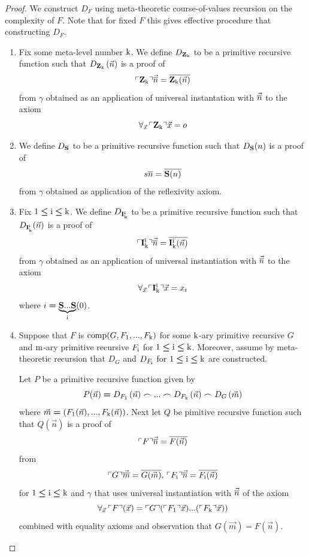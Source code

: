 \documentclass[10pt]{amsart}
\newcommand{\godel}[1]{\ulcorner #1 \urcorner}
\newcommand{\mleq}{\boldsymbol{\leq}}
\newcommand{\meq}{\boldsymbol{=}}
\begin{document}
\begin{proof}
	We construct $D_F$ using meta-theoretic course-of-values recursion on the complexity of $F$. Note that for fixed $F$ this gives effective procedure that constructing $D_F$.
	\begin{enumerate}[label=\textbf{(\arabic*)}, leftmargin=3.0em]
		\item Fix some meta-level number $\rm{k}$. We define $D_{\mathbf{Z}_{\rm{k}}}$ to be a primitive recursive function such that $D_{\mathbf{Z}_{\rm{k}}}\left(\vec{n}\right)$ is a proof of
      $$\godel{\bd{Z}_{\rm{k}}}\vec{\ol{n}} = \ol{\bd{Z}_{\rm{k}}(\vec{n})}$$
		      from $\gamma$ obtained as an application of universal instantation with $\vec{\overline{n}}$ to the axiom
          $$\forall_{\vec{x}}\,\godel{\bd{Z}_{\rm{k}}}\vec{x} = o$$
		\item We define $D_{\mathbf{S}}$ to be a primitive recursive function such that $D_{\mathbf{S}}(n)$ is a proof of
		      $$s\overline{n} = \overline{\mathbf{S}(n)}$$
		      from $\gamma$ obtained as application of the reflexivity axiom.
		\item Fix $\rm{1} \mleq \rm{i} \mleq \rm{k}$. We define $D_{\mathbf{I}^{\rm{i}}_{\rm{k}}}$ to be a primitive recursive function such that $D_{\mathbf{I}^{\rm{i}}_{\rm{k}}}(\vec{n})$ is a proof of
      $$\godel{\bd{I}^{\rm{i}}_{\rm{k}}}\vec{\ol{n}} = \ol{\bd{I}^{\rm{i}}_{\rm{k}}(\vec{n})}$$
		      from $\gamma$ obtained as an application of universal instantiation with $\vec{\overline{n}}$ to the axiom
          $$\forall_{\vec{x}}\,\godel{\bd{I}^{\rm{i}}_{\rm{k}}}\vec{x} = x_i$$
          where $i \meq \underbrace{\bd{S}...\bd{S}}_{\rm{i}}(0)$.
		\item Suppose that $F$ is $\mathrm{comp}(G,F_{\rm{1}},...,F_{\rm{k}})$ for some $\rm{k}$-ary primitive recursive $G$ and $\rm{m}$-ary primitive recursive $F_{\rm{i}}$ for $\rm{1} \mleq \rm{i} \mleq \rm{k}$. Moreover, assume by meta-theoretic recursion that $D_{G}$ and $D_{F_{\rm{i}}}$ for $\rm{1} \mleq \rm{i} \mleq \rm{k}$ are constructed.

		      Let $P$ be a primitive recursive function given by
		      $$P(\vec{n}) \meq D_{F_{\rm{1}}}\left(\vec{n}\right) \frown ... \frown D_{F_{\rm{k}}}\left(\vec{n}\right)\frown D_G\left(\vec{m}\right)$$
		      where $\vec{m} \meq \left(F_{\rm{1}}(\vec{n}),...,F_{\rm{k}}(\vec{n})\right)$. Next let $Q$ be pimitive recursive function such that $Q(\vec{n})$ is a proof of
		      $$\godel{F}\vec{\ol{n}} = \ol{F(\vec{n})}$$
		      from
		      $$\godel{G}\vec{\ol{m}} = \ol{G(\vec{m})},\,\godel{F_{\rm{i}}}\vec{\ol{n}} = \ol{F_{\rm{i}}(\vec{n})}$$
		      for $\rm{1} \mleq \rm{i} \mleq \rm{k}$ and $\gamma$ that uses universal instantiation with $\vec{\overline{n}}$ of the axiom
		      $$\forall_{\vec{x}}\,\godel{F}(\vec{x}) = \godel{G}(\godel{F_{\rm{1}}}\vec{x})...(\godel{F_{\rm{k}}}\vec{x}))$$
		      combined with equality axioms and observation that $G(\vec{m}) \meq F(\vec{n})$.


\end{enumerate}
\end{proof}
\end{document}
